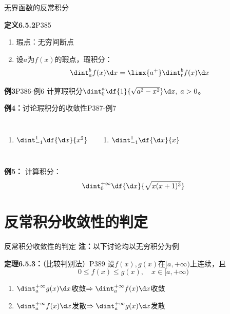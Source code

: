 \begin{frame}{无界函数的反常积分}
	\linespread{1.2}\pause 
	\begin{block}{{\bf 定义6.5.2}\hfill P385}
		\begin{enumerate}\pause 
		  \item {\bb 瑕点：}无穷间断点\pause 
		  \item 设$a$为$f(x)$的瑕点，{\bb 瑕积分：}
		  $$\dint_a^bf(x)\d x=\limx{a^+}\dint_t^bf(x)\d x$$
		\end{enumerate}
	\end{block}\pause 
	\begin{exampleblock}{{\bf 例3}\hfill P386-例6}
		计算瑕积分$\dint_0^a\df{1}{\sqrt{a^2-x^2}}\d x,\;a>0$。
	\end{exampleblock}
\end{frame}

\begin{frame}
	\linespread{1.2}
	\begin{exampleblock}{{\bf 例4：}讨论瑕积分的收敛性\hfill P387-例7}
		\begin{columns}\pause 
				\begin{enumerate}
				  \item $\dint_{-1}^1\df{\d x}{x^2}$\pause 
				\end{enumerate}
				\begin{enumerate}
				  \addtocounter{enumi}{1}
				  \item $\dint_{-1}^1\df{\d x}{x}$
				\end{enumerate}
		\end{columns}
	\end{exampleblock}\pause 
	\bigskip
	\begin{exampleblock}{{\bf 例5：}\hfill}
		计算积分：$$\dint_0^{+\infty}\df{\d x}{\sqrt{x(x+1)^3}}$$
	\end{exampleblock}
\end{frame}

\section{反常积分收敛性的判定}

\begin{frame}{反常积分收敛性的判定}
	\linespread{1.2}\pause 
	{\bf 注：}以下讨论均以无穷积分为例\pause 
	\begin{block}{{\bf 定理6.5.3：}（比较判别法）\hfill P389}\pause 
		设$f(x),g(x)$在$[a,+\infty)$上连续，且
		$$0\leq f(x)\leq g(x),\quad x\in[a,+\infty)$$\pause 
		\vspace{-1em}
		\begin{enumerate}
		  \item
		  $\dint_a^{+\infty}g(x)\d x$收敛$\Rightarrow\dint_a^{+\infty}f(x)\d x$收敛\pause 
		  \item $\dint_a^{+\infty}f(x)\d x$发散$\Rightarrow\dint_a^{+\infty}g(x)\d x$发散
		\end{enumerate}
	\end{block}
\end{frame}

